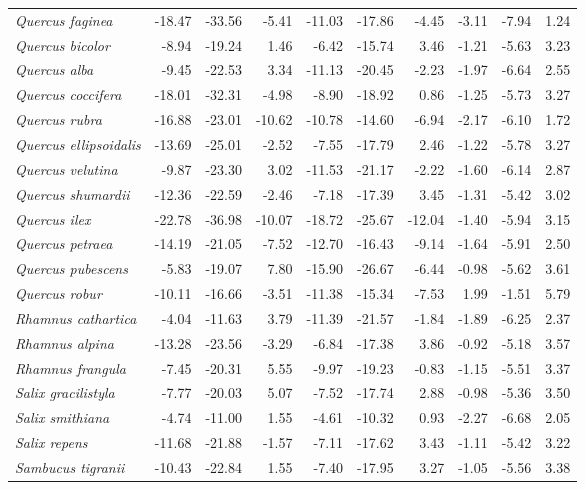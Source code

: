 \documentclass[11pt]{article}
\begin{document}
\begin{longtable}{lrrrrrrrrr}
  \emph{Quercus faginea} & -18.47 & -33.56 & -5.41 & -11.03 & -17.86 & -4.45 & -3.11 & -7.94 & 1.24 \\ 
  \emph{Quercus bicolor} & -8.94 & -19.24 & 1.46 & -6.42 & -15.74 & 3.46 & -1.21 & -5.63 & 3.23 \\ 
  \emph{Quercus alba} & -9.45 & -22.53 & 3.34 & -11.13 & -20.45 & -2.23 & -1.97 & -6.64 & 2.55 \\ 
  \emph{Quercus coccifera} & -18.01 & -32.31 & -4.98 & -8.90 & -18.92 & 0.86 & -1.25 & -5.73 & 3.27 \\ 
  \emph{Quercus rubra} & -16.88 & -23.01 & -10.62 & -10.78 & -14.60 & -6.94 & -2.17 & -6.10 & 1.72 \\ 
  \emph{Quercus ellipsoidalis} & -13.69 & -25.01 & -2.52 & -7.55 & -17.79 & 2.46 & -1.22 & -5.78 & 3.27 \\ 
  \emph{Quercus velutina} & -9.87 & -23.30 & 3.02 & -11.53 & -21.17 & -2.22 & -1.60 & -6.14 & 2.87 \\ 
  \emph{Quercus shumardii} & -12.36 & -22.59 & -2.46 & -7.18 & -17.39 & 3.45 & -1.31 & -5.42 & 3.02 \\ 
  \emph{Quercus ilex} & -22.78 & -36.98 & -10.07 & -18.72 & -25.67 & -12.04 & -1.40 & -5.94 & 3.15 \\ 
  \emph{Quercus petraea} & -14.19 & -21.05 & -7.52 & -12.70 & -16.43 & -9.14 & -1.64 & -5.91 & 2.50 \\ 
  \emph{Quercus pubescens} & -5.83 & -19.07 & 7.80 & -15.90 & -26.67 & -6.44 & -0.98 & -5.62 & 3.61 \\ 
  \emph{Quercus robur} & -10.11 & -16.66 & -3.51 & -11.38 & -15.34 & -7.53 & 1.99 & -1.51 & 5.79 \\ 
  \emph{Rhamnus cathartica} & -4.04 & -11.63 & 3.79 & -11.39 & -21.57 & -1.84 & -1.89 & -6.25 & 2.37 \\ 
  \emph{Rhamnus alpina} & -13.28 & -23.56 & -3.29 & -6.84 & -17.38 & 3.86 & -0.92 & -5.18 & 3.57 \\ 
  \emph{Rhamnus frangula} & -7.45 & -20.31 & 5.55 & -9.97 & -19.23 & -0.83 & -1.15 & -5.51 & 3.37 \\ 
  \emph{Salix gracilistyla} & -7.77 & -20.03 & 5.07 & -7.52 & -17.74 & 2.88 & -0.98 & -5.36 & 3.50 \\ 
  \emph{Salix smithiana} & -4.74 & -11.00 & 1.55 & -4.61 & -10.32 & 0.93 & -2.27 & -6.68 & 2.05 \\ 
  \emph{Salix repens} & -11.68 & -21.88 & -1.57 & -7.11 & -17.62 & 3.43 & -1.11 & -5.42 & 3.22 \\ 
  \emph{Sambucus tigranii} & -10.43 & -22.84 & 1.55 & -7.40 & -17.95 & 3.27 & -1.05 & -5.56 & 3.38 \\ 

\end{longtable}
\end{document}
